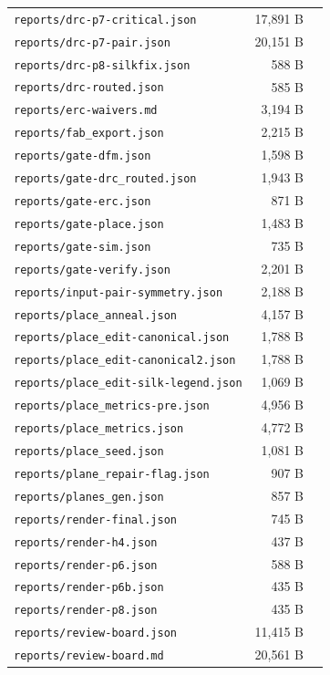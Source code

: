 \documentclass[11pt,a4paper]{article}
\begin{document}
{\begin{longtable}{p{9cm}rp{4cm}}
\texttt{reports/drc-p7-critical.json} & 17,891 B &  \\
\texttt{reports/drc-p7-pair.json} & 20,151 B &  \\
\texttt{reports/drc-p8-silkfix.json} & 588 B &  \\
\texttt{reports/drc-routed.json} & 585 B &  \\
\texttt{reports/erc-waivers.md} & 3,194 B &  \\
\texttt{reports/fab\_export.json} & 2,215 B &  \\
\texttt{reports/gate-dfm.json} & 1,598 B &  \\
\texttt{reports/gate-drc\_routed.json} & 1,943 B &  \\
\texttt{reports/gate-erc.json} & 871 B &  \\
\texttt{reports/gate-place.json} & 1,483 B &  \\
\texttt{reports/gate-sim.json} & 735 B &  \\
\texttt{reports/gate-verify.json} & 2,201 B &  \\
\texttt{reports/input-pair-symmetry.json} & 2,188 B &  \\
\texttt{reports/place\_anneal.json} & 4,157 B &  \\
\texttt{reports/place\_edit-canonical.json} & 1,788 B &  \\
\texttt{reports/place\_edit-canonical2.json} & 1,788 B &  \\
\texttt{reports/place\_edit-silk-legend.json} & 1,069 B &  \\
\texttt{reports/place\_metrics-pre.json} & 4,956 B &  \\
\texttt{reports/place\_metrics.json} & 4,772 B &  \\
\texttt{reports/place\_seed.json} & 1,081 B &  \\
\texttt{reports/plane\_repair-flag.json} & 907 B &  \\
\texttt{reports/planes\_gen.json} & 857 B &  \\
\texttt{reports/render-final.json} & 745 B &  \\
\texttt{reports/render-h4.json} & 437 B &  \\
\texttt{reports/render-p6.json} & 588 B &  \\
\texttt{reports/render-p6b.json} & 435 B &  \\
\texttt{reports/render-p8.json} & 435 B &  \\
\texttt{reports/review-board.json} & 11,415 B &  \\
\texttt{reports/review-board.md} & 20,561 B &  \\

\end{longtable}}
\end{document}
